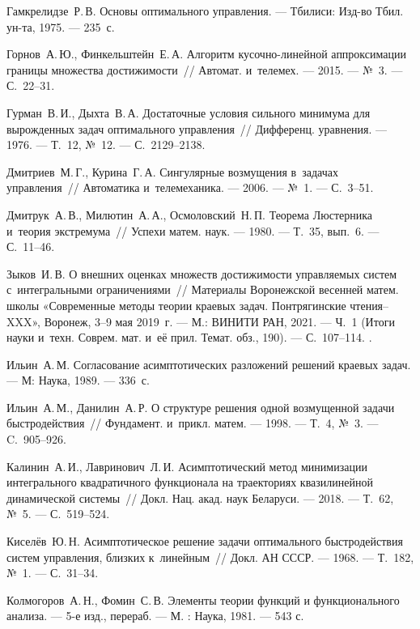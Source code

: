 \documentclass[../main.tex]{subfiles}
\begin{document}
\begin{thebibliography}{99}
Гамкрелидзе~Р.\,В. Основы оптимального управления. --- Тбилиси: Изд-во Тбил. ун-та, 1975. --- 235~с.

Горнов~А.\,Ю., Финкельштейн~Е.\,А. Алгоритм кусочно-линейной аппроксимации границы множества достижимости~// Автомат. и~телемех. --- 2015. --- №~3. --- С.~22--31.

Гурман~В.\,И., Дыхта~В.\,А. Достаточные условия сильного минимума для вырожденных задач оптимального управления~// Дифференц. уравнения. --- 1976. --- Т.~12, №~12. --- С.~2129--2138.

Дмитриев~М.\,Г., Курина~Г.\,А. Сингулярные возмущения в~задачах управления~// Автоматика и~телемеханика. --- 2006. --- №~1. --- С.~3--51.

Дмитрук~А.\,В., Милютин~А.\,А., Осмоловский~Н.\,П. Теорема Люстерника и~теория экстремума~// Успехи матем. наук. --- 1980. --- Т.~35, вып.~6. --- С.~11--46.

Зыков~И.\,В. О внешних оценках множеств достижимости управляемых систем с~интегральными ограничениями~// Материалы Воронежской весенней матем. школы «Современные методы теории краевых задач. Понтрягинские чтения–XXX», Воронеж, 3--9 мая 2019~г. --- М.: ВИНИТИ РАН, 2021. --- Ч.~1 (Итоги науки и~техн. Соврем. мат. и~её прил. Темат. обз., 190). --- С.~107--114. .

Ильин~А.\,М. Согласование асимптотических разложений решений краевых задач. --- М: Наука, 1989. --- 336~с.

Ильин~А.\,М., Данилин~А.\,Р. О структуре решения одной возмущенной задачи быстродействия~// Фундамент. и~прикл. матем. --- 1998. --- Т.~4, №~3. --- C.~905--926.

Калинин~А.\,И., Лавринович~Л.\,И. Асимптотический метод минимизации интегрального квадратичного функционала на траекториях квазилинейной динамической системы~// Докл. Нац. акад. наук Беларуси. --- 2018. --- Т.~62, №~5. --- С.~519--524. 

Киселёв~Ю.\,Н. Асимптотическое решение задачи оптимального быстродействия систем управления, близких к~линейным~// Докл. АН СССР. --- 1968. --- Т.~182, №~1. --- С.~31--34.


Колмогоров~А.\,Н., Фомин~С.\,В. Элементы теории функций и функционального анализа. --- 5-е изд., перераб. --- М. : Наука, 1981. --- 543 с.


\end{thebibliography}
\end{document}
